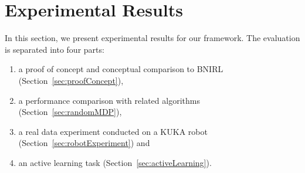 \documentclass[twoside,11pt]{article}
\newcommand{\first}{(i)}
\newcommand{\second}{(ii)}
\newcommand{\third}{(iii)}
\newcommand{\fourth}{(iv)}
\begin{document}
\section{Experimental Results}
\label{sec:results}
In this section, we present experimental results for our framework. The evaluation is separated into four parts: 
\begin{enumerate}[topsep=-\parskip+1ex, itemsep=0ex, parsep=0mm]
\item[\first] a proof of concept and conceptual comparison to BNIRL (Section~\ref{sec:proofConcept}), 
\item[\second] a performance comparison with related algorithms (Section~\ref{sec:randomMDP}), 
\item[\third] a real data experiment conducted on a KUKA robot (Section~\ref{sec:robotExperiment}) and 
\item[\fourth] an active learning task (Section~\ref{sec:activeLearning}).
\end{enumerate}
\end{document}
